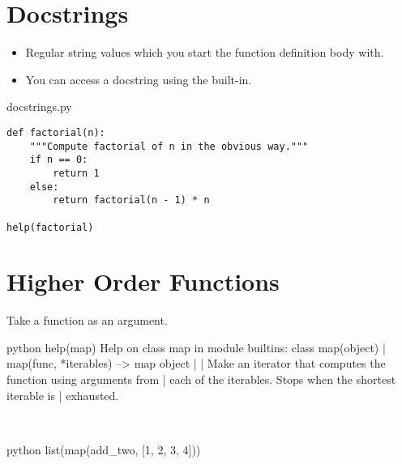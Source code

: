 \documentclass[aspectratio=1610,slidestop]{beamer}
\begin{document}
\section{Docstrings}
\begin{pframe}
 \vspace{-1.1cm}
 \begin{itemize}
  \item Regular string values which you start the function definition body with.
  \item You can access a docstring using the  built-in.
 \end{itemize}
 \vspace{-0.3cm}
 \begin{pythonfile}{docstrings.py}
  \begin{verbatim}
def factorial(n):
    """Compute factorial of n in the obvious way."""
    if n == 0:
        return 1
    else:
        return factorial(n - 1) * n

help(factorial)
  \end{verbatim}
 \end{pythonfile}
 \pause
 \begin{terminal}
 \end{terminal}
\end{pframe}

\section{Higher Order Functions}
\begin{pframe}
 Take a function as an argument.
 \begin{ipython}
  \begin{pythonin}{python}
help(map)
Help on class map in module builtins:
class map(object)
 |  map(func, *iterables) --> map object
 |
 |  Make an iterator that computes the function using arguments from
 |  each of the iterables.  Stops when the shortest iterable is
 |  exhausted.
  \end{pythonin}
  \\

 \begin{pythonin}{python}
list(map(add_two, [1, 2, 3, 4]))
  \end{pythonin}
  \\
  \begin{pythonout}
[3, 4, 5, 6]
  \end{pythonout}
 \end{ipython}
\end{pframe}
\end{document}
